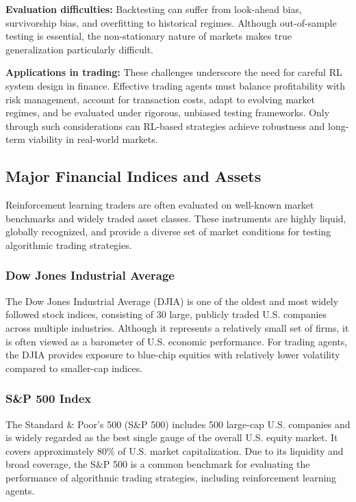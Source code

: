 \documentclass[12pt,a4paper]{report}
\begin{document}
\bigskip
\textbf{Evaluation difficulties:}  
Backtesting can suffer from look-ahead bias, survivorship bias, and overfitting to historical regimes. Although out-of-sample testing is essential, the non-stationary nature of markets makes true generalization particularly difficult.

\bigskip
\textbf{Applications in trading:}  
These challenges underscore the need for careful RL system design in finance. Effective trading agents must balance profitability with risk management, account for transaction costs, adapt to evolving market regimes, and be evaluated under rigorous, unbiased testing frameworks. Only through such considerations can RL-based strategies achieve robustness and long-term viability in real-world markets.


\subsection{Major Financial Indices and Assets}

Reinforcement learning traders are often evaluated on well-known market benchmarks and widely traded asset classes. These instruments are highly liquid, globally recognized, and provide a diverse set of market conditions for testing algorithmic trading strategies.

\subsubsection{Dow Jones Industrial Average}

The Dow Jones Industrial Average (DJIA) is one of the oldest and most widely followed stock indices, consisting of 30 large, publicly traded U.S. companies across multiple industries. Although it represents a relatively small set of firms, it is often viewed as a barometer of U.S. economic performance.  
For trading agents, the DJIA provides exposure to blue-chip equities with relatively lower volatility compared to smaller-cap indices.

\subsubsection{S\&P 500 Index}

The Standard \& Poor’s 500 (S\&P 500) includes 500 large-cap U.S. companies and is widely regarded as the best single gauge of the overall U.S. equity market. It covers approximately 80\% of U.S. market capitalization.  
Due to its liquidity and broad coverage, the S\&P 500 is a common benchmark for evaluating the performance of algorithmic trading strategies, including reinforcement learning agents.
\end{document}
